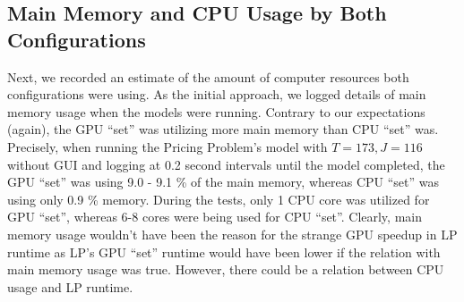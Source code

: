 \begin{appendices}
    \subsection{Main Memory and CPU Usage by Both Configurations}
    Next, we recorded an estimate of the amount of computer resources both configurations were using.
    As the initial approach, we logged details of main memory usage when the models were running. Contrary to our expectations (again), the GPU ``set'' was utilizing more main memory than CPU ``set'' was. Precisely, when running the Pricing Problem's model with $T = 173, J = 116$ without GUI and logging at 0.2 second intervals until the model completed, the GPU ``set'' was using 9.0 - 9.1 \% of the main memory, whereas CPU ``set'' was using only 0.9 \% memory. During the tests, only 1 CPU core was utilized for GPU ``set'', whereas 6-8 cores were being used for CPU ``set''. Clearly, main memory usage wouldn't have been the reason for the strange GPU speedup in LP runtime as LP's GPU ``set'' runtime would have been lower if the relation with main memory usage was true. However, there could be a relation between CPU usage and LP runtime.
    
    \begin{figure}[!htbp]
        \centering
\end{figure}
\end{appendices}
